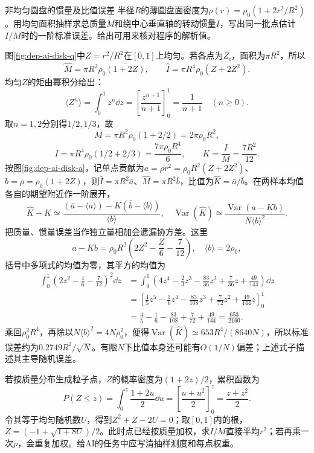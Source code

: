 \begin{example}非均匀圆盘的惯量及比值误差
半径$R$的薄圆盘面密度为$\rho(r)=\rho_0(1+2r^2/R^2)$。用均匀面积抽样求总质量$M$和绕中心垂直轴的转动惯量$I$，写出同一批点估计$I/M$时的一阶标准误差。给出可用来核对程序的解析值。
\end{example}
\begin{solution}
图\ref{fig:dep-ai-disk-q}中$Z=r^2/R^2$在$[0,1]$上均匀。若各点为$Z_i$，面积为$\pi R^2$，所以
\[
 \widehat M=\pi R^2\rho_0\overline{(1+2Z)},\qquad
 \widehat I=\pi R^4\rho_0\overline{(Z+2Z^2)}.
\]
均匀$Z$的矩由幂积分给出：
\[\langle Z^n\rangle=\int_0^1z^n\dd z
=\left[\frac{z^{n+1}}{n+1}\right]_0^1=\frac1{n+1}\quad(n\ge0).\]
取$n=1,2$分别得$1/2,1/3$，故
\[M=\pi R^2\rho_0(1+2/2)=2\pi\rho_0R^2,\]
\[I=\pi R^4\rho_0(1/2+2/3)=\frac{7\pi\rho_0R^4}{6},\qquad
K=\frac IM=\frac{7R^2}{12}.\]
按图\ref{fig:dep-ai-disk-a}，记单点贡献为$a=\rho r^2=\rho_0R^2(Z+2Z^2)$、$b=\rho=\rho_0(1+2Z)$，则$\widehat I=\pi R^2\bar a$、$\widehat M=\pi R^2\bar b$，比值为$\widehat K=\bar a/\bar b$。在两样本均值各自的期望附近作一阶展开，
\[
 \widehat K-K\simeq\frac{(\bar a-\langle a\rangle)
 -K(\bar b-\langle b\rangle)}{\langle b\rangle},
 \quad\operatorname{Var}(\widehat K)\simeq
 \frac{\operatorname{Var}(a-Kb)}{N\langle b\rangle^2}.
\]
把质量、惯量误差当作独立量相加会遗漏协方差。这里
\[
 a-Kb=\rho_0R^2\left(2Z^2-\frac Z6-\frac7{12}\right),\quad
 \langle b\rangle=2\rho_0,
\]
括号中多项式的均值为零，其平方的均值为
\begin{align*}
\int_0^1\left(2z^2-\frac z6-\frac7{12}\right)^2\dd z
&=\int_0^1\left(4z^4-\frac23z^3-\frac{83}{36}z^2
+\frac7{36}z+\frac{49}{144}\right)\dd z\\
&=\left[\frac45z^5-\frac16z^4-\frac{83}{108}z^3
+\frac7{72}z^2+\frac{49}{144}z\right]_0^1\\
&=\frac45-\frac16-\frac{83}{108}+\frac7{72}+\frac{49}{144}
=\frac{653}{2160}.
\end{align*}
乘回$\rho_0^2R^4$，再除以$N\langle b\rangle^2=4N\rho_0^2$，便得$\operatorname{Var}(\widehat K)\simeq653R^4/(8640N)$，所以标准误差约为$0.2749R^2/\sqrt N$。有限$N$下比值本身还可能有$O(1/N)$偏差；上述式子描述其主导随机误差。

若按质量分布生成粒子点，$Z$的概率密度为$(1+2z)/2$，累积函数为
\[P(Z\le z)=\int_0^z\frac{1+2u}{2}\dd u
=\left[\frac{u+u^2}{2}\right]_0^z=\frac{z+z^2}{2}.\]
令其等于均匀随机数$U$，得到$Z^2+Z-2U=0$；取$[0,1]$内的根，$Z=(-1+\sqrt{1+8U})/2$。此时点已经按质量加权，求$I/M$直接平均$r^2$；若再乘一次$\rho$，会重复加权。给AI的任务中应写清抽样测度和每点权重。
\end{solution}

